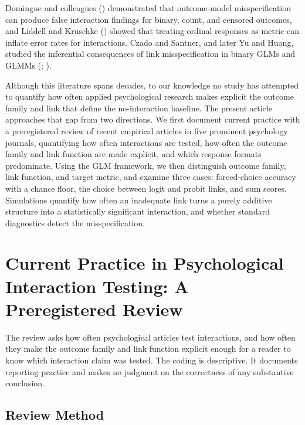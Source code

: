 \documentclass[
  man,
  floatsintext,
  longtable,
  nolmodern,
  notxfonts,
  notimes,
  colorlinks=true,linkcolor=blue,citecolor=blue,urlcolor=blue]{apa7}
\begin{document}
Domingue and colleagues () demonstrated
that outcome-model misspecification can produce false interaction
findings for binary, count, and censored outcomes, and Liddell and
Kruschke () showed that treating
ordinal responses as metric can inflate error rates for interactions.
Czado and Santner, and later Yu and Huang, studied the inferential
consequences of link misspecification in binary GLMs and GLMMs
(;
).

Although this literature spans decades, to our knowledge no study has
attempted to quantify how often applied psychological research makes
explicit the outcome family and link that define the no-interaction
baseline. The present article approaches that gap from two directions.
We first document current practice with a preregistered review of recent
empirical articles in five prominent psychology journals, quantifying
how often interactions are tested, how often the outcome family and link
function are made explicit, and which response formats predominate.
Using the GLM framework, we then distinguish outcome family, link
function, and target metric, and examine three cases: forced-choice
accuracy with a chance floor, the choice between logit and probit links,
and sum scores. Simulations quantify how often an inadequate link turns
a purely additive structure into a statistically significant
interaction, and whether standard diagnostics detect the
misspecification.

\section{Current Practice in Psychological Interaction Testing: A
Preregistered
Review}\label{current-practice-in-psychological-interaction-testing-a-preregistered-review}

The review asks how often psychological articles test interactions, and
how often they make the outcome family and link function explicit enough
for a reader to know which interaction claim was tested. The coding is
descriptive. It documents reporting practice and makes no judgment on
the correctness of any substantive conclusion.

\subsection{Review Method}\label{review-method}
\end{document}
